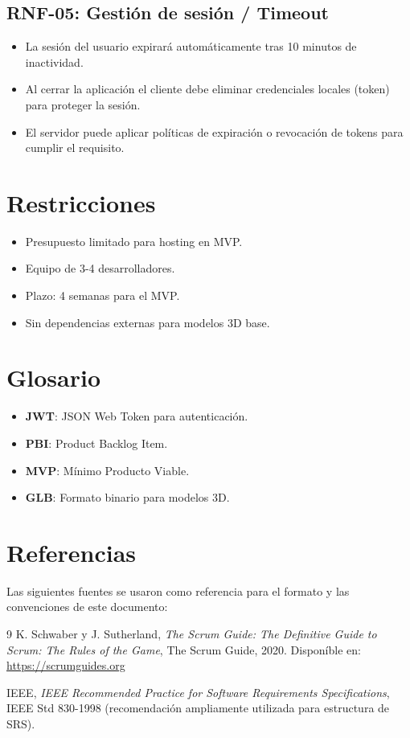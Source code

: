 \documentclass[12pt,a4paper]{article}
\begin{document}
\subsection{RNF-05: Gestión de sesión / Timeout}
\begin{itemize}[leftmargin=*]
    \item La sesión del usuario expirará automáticamente tras 10 minutos de inactividad.
    \item Al cerrar la aplicación el cliente debe eliminar credenciales locales (token) para proteger la sesión.
    \item El servidor puede aplicar políticas de expiraci\'on o revocaci\'on de tokens para cumplir el requisito.
\end{itemize}

\section{Restricciones}
\begin{itemize}[leftmargin=*]
    \item Presupuesto limitado para hosting en MVP.
    \item Equipo de 3-4 desarrolladores.
    \item Plazo: 4 semanas para el MVP.
    \item Sin dependencias externas para modelos 3D base.
\end{itemize}

\section{Glosario}
\begin{itemize}[leftmargin=*]
    \item \textbf{JWT}: JSON Web Token para autenticaci\'on.
    \item \textbf{PBI}: Product Backlog Item.
    \item \textbf{MVP}: M\'inimo Producto Viable.
    \item \textbf{GLB}: Formato binario para modelos 3D.
\end{itemize}
\newpage
\section{Referencias}
Las siguientes fuentes se usaron como referencia para el formato y las convenciones de este documento:
\begin{thebibliography}{9}
K. Schwaber y J. Sutherland,
\textit{The Scrum Guide: The Definitive Guide to Scrum: The Rules of the Game},
The Scrum Guide, 2020. Dispon\'ible en: \url{https://scrumguides.org}

IEEE,
\textit{IEEE Recommended Practice for Software Requirements Specifications},
IEEE Std 830-1998 (recomendaci\'on ampliamente utilizada para estructura de SRS).
\end{thebibliography}
\end{document}
